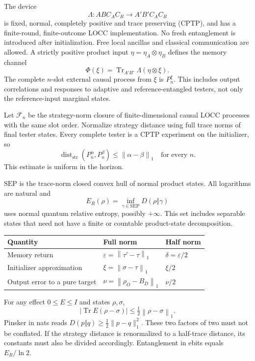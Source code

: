 \documentclass[11pt,a4paper]{article}
\numberwithin{equation}{section}
\theoremstyle{remark}
\newcommand{\tr}{\operatorname{Tr}}
\newcommand{\SEP}{\mathrm{SEP}}
\newcommand{\ER}{E_R}
\newcommand{\dd}{\operatorname{dist}_{\mathrm{str}}}
\newcommand{\normone}[1]{\left\|#1\right\|_1}
\begin{document}
The device
\[
 \Lambda:AB C_A C_B\longrightarrow A'B'C_A C_B
\]
is fixed, normal, completely positive and trace preserving (CPTP), and has a
finite-round, finite-outcome LOCC implementation. No fresh entanglement is
introduced after initialization. Free local ancillas and classical communication
are allowed. A strictly positive product input
\(\eta=\eta_A\otimes\eta_B\) defines the memory channel
\[
 \Phi(\xi)=\tr_{A'B'}\Lambda(\eta\otimes\xi).
\]
The complete \(n\)-slot external causal process from \(\xi\) is \(P_n^\xi\).
This includes output correlations and responses to adaptive and
reference-entangled testers, not only the reference-input marginal states.

Let \(\mathcal F_n\) be the strategy-norm closure of finite-dimensional
causal LOCC processes with the same slot order. Normalize strategy distance
using full trace norms of final tester states. Every complete tester is a
CPTP experiment on the initializer, so
\begin{equation}
 \dd(P_n^\alpha,P_n^\beta)\leq\normone{\alpha-\beta}
 \quad\text{for every }n.                         \label{eq:contract}
\end{equation}
This estimate is uniform in the horizon.

\(\SEP\) is the trace-norm closed convex hull of normal product states.
All logarithms are natural and
\[
 \ER(\rho)=\inf_{\gamma\in\SEP}D(\rho\Vert\gamma)
\]
uses normal quantum relative entropy, possibly \(+\infty\).
This set includes separable states that need not have a finite or countable
product-state decomposition.

\begin{center}
\begin{tabular}{lll}
\toprule
Quantity & Full norm & Half norm\\
\midrule
Memory return & \(\varepsilon=\normone{\tau'-\tau}\) &
 \(\delta=\varepsilon/2\)\\
Initializer approximation & \(\xi=\normone{\sigma-\tau}\) &
 \(\xi/2\)\\
Output error to a pure target & \(\nu=\normone{\rho_O-B_D}\) &
 \(\nu/2\)\\
\bottomrule
\end{tabular}
\end{center}
For any effect \(0\leq E\leq I\) and states \(\rho,\sigma\),
\[
 |\tr E(\rho-\sigma)|\leq\tfrac12\normone{\rho-\sigma}.
\]
Pinsker in nats reads \(D(p\Vert q)\geq\frac12\|p-q\|_1^2\).
These two factors of two must not be conflated. If the strategy distance is
renormalized to a half-trace distance, its constants must also be divided
accordingly. Entanglement in ebits equals \(\ER/\ln2\).
\end{document}
